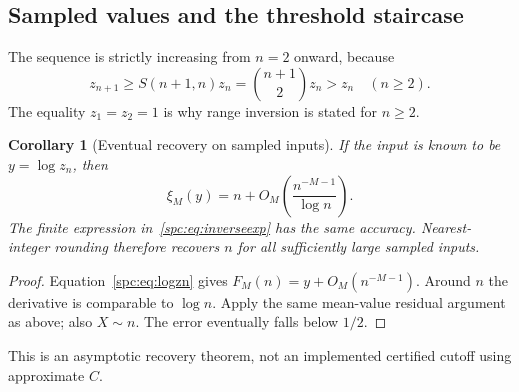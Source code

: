 \documentclass[11pt,letterpaper]{article}
\newtheorem{corollary}[theorem]{Corollary}
\theoremstyle{definition}\newtheorem{definition}[theorem]{Definition}
\theoremstyle{remark}\newtheorem{remark}[theorem]{Remark}
\begin{document}
\subsection{Sampled values and the threshold staircase}
The sequence is strictly increasing from $n=2$ onward, because
\begin{equation}\label{spc:eq:increasing}
 z_{n+1}\ge S(n+1,n)z_n=\binom{n+1}{2}z_n>z_n\quad(n\ge2).
\end{equation}
The equality $z_1=z_2=1$ is why range inversion is stated for $n\ge2$.
\begin{corollary}[Eventual recovery on sampled inputs]\label{spc:cor:sampled}
If the input is known to be $y=\log z_n$, then
\[
 \xi_M(y)=n+O_M\!\left(\frac{n^{-M-1}}{\log n}\right).
\]
The finite expression in~\eqref{spc:eq:inverseexp} has the same accuracy. Nearest-integer rounding therefore recovers $n$ for all sufficiently large sampled inputs.
\end{corollary}
\begin{proof}
Equation~\eqref{spc:eq:logzn} gives $F_M(n)=y+O_M(n^{-M-1})$. Around $n$ the derivative is comparable to $\log n$. Apply the same mean-value residual argument as above; also $X\sim n$. The error eventually falls below $1/2$.
\end{proof}
This is an asymptotic recovery theorem, not an implemented certified cutoff using approximate $C$.
\end{document}
